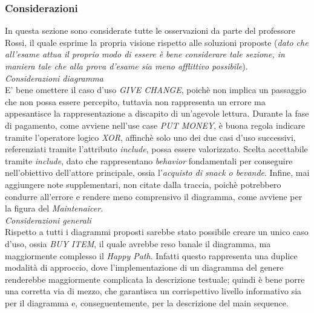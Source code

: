 \documentclass{article}
\begin{document}
\subsubsection*{Considerazioni}
In questa sezione sono considerate tutte le osservazioni da parte del professore Rossi, il quale esprime la propria visione rispetto
alle soluzioni proposte (\textit{dato che all'esame attua il proprio modo di essere è bene considerare tale sezione, in maniera tale che alla prova d'esame sia meno afflittivo possibile}).\vspace*{14pt}\\
\textit{Considerazioni diagramma}\\
E' bene omettere il caso d'uso \textit{GIVE CHANGE}, poichè non implica un passaggio che non possa essere percepito, tuttavia non rappresenta un errore ma appesantisce la rappresentazione a discapito di un'agevole lettura.
Durante la fase di pagamento, come avviene nell'use case \textit{PUT MONEY}, è buona regola indicare tramite l'operatore logico \textit{XOR}, affinchè solo uno dei due casi d'uso successivi, referenziati tramite l'attributo \textit{include}, possa essere valorizzato.
Scelta accettabile tramite \textit{include}, dato che rappresentano \textit{behavior} fondamentali per conseguire nell'obiettivo dell'attore principale, ossia l'\textit{acquisto di snack o bevande}. Infine, mai aggiungere note supplementari, non citate dalla traccia, poichè potrebbero condurre all'errore e rendere meno comprensivo il diagramma, come avviene per la figura del \textit{Maintenaicer}.\vspace{14pt}\\
\textit{Considerazioni generali}\\
Rispetto a tutti i diagrammi proposti sarebbe stato possibile creare un unico caso d'uso, ossia \textit{BUY ITEM}, il quale avrebbe reso banale il diagramma, ma maggiormente complesso il \textit{Happy Path}. Infatti questo rappresenta una duplice modalità di approccio, dove l'implementazione di un diagramma del genere renderebbe maggiormente complicata la descrizione testuale; quindi è bene porre una corretta via di mezzo, che garantisca un corrispettivo livello informativo sia per il diagramma e, conseguentemente, per la descrizione del main sequence.
\end{document}
